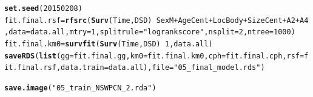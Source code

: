 \documentclass{article}\usepackage[]{graphicx}\usepackage[]{color}
\makeatletter
\newcommand{\hlnum}[1]{\textcolor[rgb]{0.686,0.059,0.569}{#1}}%
\newcommand{\hlstr}[1]{\textcolor[rgb]{0.192,0.494,0.8}{#1}}%
\newcommand{\hlopt}[1]{\textcolor[rgb]{0,0,0}{#1}}%
\newcommand{\hlstd}[1]{\textcolor[rgb]{0.345,0.345,0.345}{#1}}%
\newcommand{\hlkwb}[1]{\textcolor[rgb]{0.69,0.353,0.396}{#1}}%
\newcommand{\hlkwc}[1]{\textcolor[rgb]{0.333,0.667,0.333}{#1}}%
\newcommand{\hlkwd}[1]{\textcolor[rgb]{0.737,0.353,0.396}{\textbf{#1}}}%
\newenvironment{kframe}{%
 \def\at@end@of@kframe{}%
 \ifinner\ifhmode%
  \def\at@end@of@kframe{\end{minipage}}%
  \begin{minipage}{\columnwidth}%
 \fi\fi%
 \def\FrameCommand##1{\hskip\@totalleftmargin \hskip-\fboxsep
 \colorbox{shadecolor}{##1}\hskip-\fboxsep
     \hskip-\linewidth \hskip-\@totalleftmargin \hskip\columnwidth}%
 \MakeFramed {\advance\hsize-\width
   \@totalleftmargin\z@ \linewidth\hsize
   \@setminipage}}%
 {\par\unskip\endMakeFramed%
 \at@end@of@kframe}
\newenvironment{knitrout}{}{} %
\makeatother
\begin{document}
\begin{knitrout}
\begin{kframe}
\begin{alltt}
\hlkwd{set.seed}\hlstd{(}\hlnum{20150208}\hlstd{)}
\hlstd{fit.final.rsf} \hlkwb{=} \hlkwd{rfsrc}\hlstd{(}\hlkwd{Surv}\hlstd{(Time, DSD)} \hlopt{~} \hlstd{SexM} \hlopt{+} \hlstd{AgeCent} \hlopt{+} \hlstd{LocBody} \hlopt{+} \hlstd{SizeCent} \hlopt{+} \hlstd{A2} \hlopt{+} \hlstd{A4,} \hlkwc{data} \hlstd{= data.all,} \hlkwc{mtry} \hlstd{=} \hlnum{1}\hlstd{,} \hlkwc{splitrule} \hlstd{=} \hlstr{"logrankscore"}\hlstd{,} \hlkwc{nsplit} \hlstd{=} \hlnum{2}\hlstd{,} \hlkwc{ntree} \hlstd{=} \hlnum{1000}\hlstd{)}
\hlstd{fit.final.km0} \hlkwb{=} \hlkwd{survfit}\hlstd{(}\hlkwd{Surv}\hlstd{(Time, DSD)} \hlopt{~} \hlnum{1}\hlstd{, data.all)}
\hlkwd{saveRDS}\hlstd{(}\hlkwd{list}\hlstd{(}\hlkwc{gg} \hlstd{= fit.final.gg,} \hlkwc{km0} \hlstd{= fit.final.km0,} \hlkwc{cph} \hlstd{= fit.final.cph,} \hlkwc{rsf} \hlstd{= fit.final.rsf,} \hlkwc{data.train} \hlstd{= data.all),} \hlkwc{file} \hlstd{=} \hlstr{"05_final_model.rds"}\hlstd{)}
\end{alltt}
\end{kframe}
\end{knitrout}

\begin{knitrout}
\color{fgcolor}\begin{kframe}
\begin{alltt}
\hlkwd{save.image}\hlstd{(}\hlstr{"05_train_NSWPCN_2.rda"}\hlstd{)}
\end{alltt}
\end{kframe}
\end{knitrout}

\end{document}

